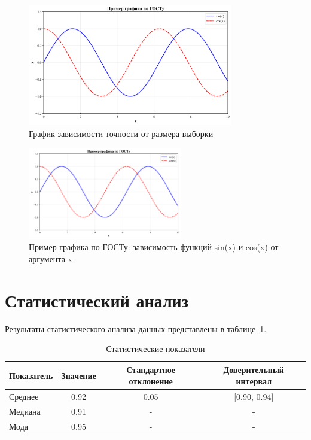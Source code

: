 \begin{figure}[H]
\centering
\includegraphics[width=0.8\textwidth]{images/example_plot.png}
\caption{График зависимости точности от размера выборки}
\label{fig:accuracy_plot}
\end{figure}

\begin{figure}[H]
\centering
\includegraphics[width=0.6\textwidth]{images/example_plot.png}
\caption{Пример графика по ГОСТу: зависимость функций sin(x) и cos(x) от аргумента x}
\label{fig:gost_example}
\end{figure}

\section{Статистический анализ}

Результаты статистического анализа данных представлены в таблице~\ref{tab:statistics}.

\begin{table}[H]
\centering
\caption{Статистические показатели}
\begin{tabular}{|l|c|c|c|}
\hline
Показатель & Значение & Стандартное отклонение & Доверительный интервал \\
\hline
Среднее & 0.92 & 0.05 & [0.90, 0.94] \\
Медиана & 0.91 & - & - \\
Мода & 0.95 & - & - \\
\hline
\end{tabular}
\label{tab:statistics}
\end{table}

